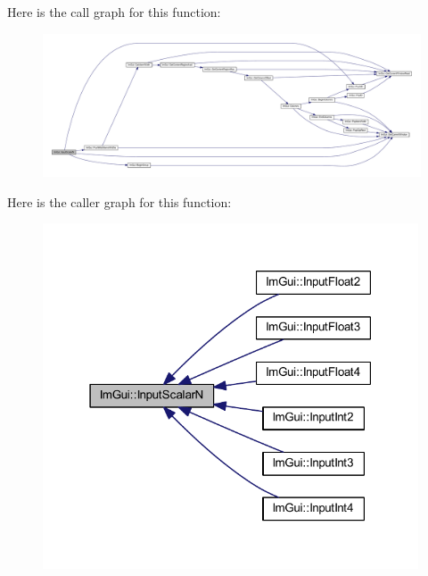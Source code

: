 Here is the call graph for this function\+:
\nopagebreak
\begin{figure}[H]
\begin{center}
\leavevmode
\includegraphics[width=350pt]{namespace_im_gui_a885fc00fd3382f0aeb34c1140303c86a_cgraph}
\end{center}
\end{figure}
Here is the caller graph for this function\+:
\nopagebreak
\begin{figure}[H]
\begin{center}
\leavevmode
\includegraphics[width=316pt]{namespace_im_gui_a885fc00fd3382f0aeb34c1140303c86a_icgraph}
\end{center}
\end{figure}
\mbox{\label{namespace_im_gui_a1da680314eaf3f60ea2a42c76f3584b0}} 
